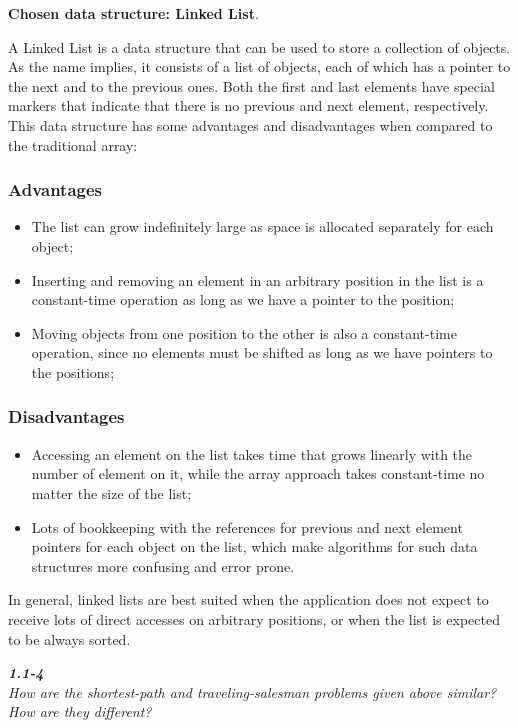 \documentclass[8pt,a4paper]{article}
\begin{document}
\textbf{Chosen data structure: Linked List}.

A Linked List is a data structure that can be used to store a collection of objects.
As the name implies, it consists of a list of objects, each of which has a pointer
to the next and to the previous ones. Both the first and last elements have
special markers that indicate that there is no previous and next element, respectively.
This data structure has some advantages and disadvantages when compared to the
traditional array:

\subsubsection*{Advantages}
\begin{itemize}
  \item The list can grow indefinitely large as space is allocated separately
    for each object;
  \item Inserting and removing an element in an arbitrary position in the
    list is a constant-time operation as long as we have a pointer to the position;
  \item Moving objects from one position to the other is also a  constant-time
    operation, since no elements must be shifted as long as we have pointers
    to the positions;
\end{itemize}

\subsubsection*{Disadvantages}
\begin{itemize}
  \item Accessing an element on the list takes time that grows linearly with
    the number of element on it, while the array approach takes constant-time
    no matter the size of the list;
  \item Lots of bookkeeping with the references for previous and next element
    pointers for each object on the list, which make algorithms for such data
    structures more confusing and error prone.
\end{itemize}

In general, linked lists are best suited when the application does not expect
to receive lots of direct accesses on arbitrary positions, or when the list
is expected to be always sorted.

\begin{framed}
\textbf{\textit{1.1-4}} \\
\textit{How are the shortest-path and traveling-salesman problems given above
similar? How are they different?}
\end{framed}
\end{document}
